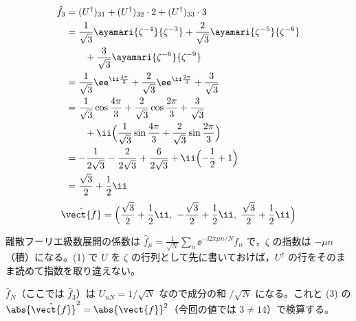 \begin{align*}
  \hat{f}_3&=(U^{\dagger})_{31}+(U^{\dagger})_{32}\cdot2+(U^{\dagger})_{33}\cdot3\\
  &=\frac{1}{\sqrt{3}}\ayamari{\zeta^{-4}}{\zeta^{-3}}+\frac{2}{\sqrt{3}}\ayamari{\zeta^{-5}}{\zeta^{-6}}\\
  &\qquad+\frac{3}{\sqrt{3}}\ayamari{\zeta^{-6}}{\zeta^{-9}}\\
  &=\frac{1}{\sqrt{3}}\ee^{\ii\frac{4\pi}{3}}+\frac{2}{\sqrt{3}}\ee^{\ii\frac{2\pi}{3}}+\frac{3}{\sqrt{3}}\\
  &=\frac{1}{\sqrt{3}}\cos\frac{4\pi}{3}+\frac{2}{\sqrt{3}}\cos\frac{2\pi}{3}+\frac{3}{\sqrt{3}}\\
  &\qquad+\ii\Bigl(\frac{1}{\sqrt{3}}\sin\frac{4\pi}{3}+\frac{2}{\sqrt{3}}\sin\frac{2\pi}{3}\Bigr)\\
  &=-\frac{1}{2\sqrt{3}}-\frac{2}{2\sqrt{3}}+\frac{6}{2\sqrt{3}}+\ii\Bigl(-\frac{1}{2}+1\Bigr)\\
  &=\frac{\sqrt{3}}{2}+\frac{1}{2}\ii
\end{align*}
\[
  \hat{\vect{f}}=\Bigl(\frac{\sqrt{3}}{2}+\frac{1}{2}\ii,\ -\frac{\sqrt{3}}{2}+\frac{1}{2}\ii,\ \frac{\sqrt{3}}{2}+\frac{1}{2}\ii\Bigr)
\]
\mikai
{}
\mikai
\item 離散フーリエ級数展開の係数は $\hat{f}_{\mu}=\frac{1}{\sqrt{N}}\sum_n\ee^{-\ii2\pi\mu n/N}f_n$ で，$\zeta$ の指数は $-\mu n$（積）になる。(1) で $U$ を $\zeta$ の行列として先に書いておけば，$U^{\dagger}$ の行をそのまま読めて指数を取り違えない。
\item $\hat{f}_N$（ここでは $\hat{f}_3$）は $U_{nN}=1/\sqrt{N}$ なので成分の和 $/\sqrt{N}$ になる。これと (3) の $\abs{\hat{\vect{f}}}^{2}=\abs{\vect{f}}^{2}$（今回の値では $3\neq14$）で検算する。

